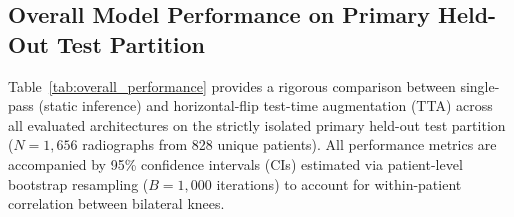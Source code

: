 \documentclass[10pt,journal]{IEEEtran}
\begin{document}
\subsection{Overall Model Performance on Primary Held-Out Test Partition}
\label{subsec:overall_performance}

Table~\ref{tab:overall_performance} provides a rigorous comparison between single-pass (static inference) and horizontal-flip test-time augmentation (TTA) across all evaluated architectures on the strictly isolated primary held-out test partition ($N = 1{,}656$ radiographs from 828 unique patients). All performance metrics are accompanied by 95\% confidence intervals (CIs) estimated via patient-level bootstrap resampling ($B = 1{,}000$ iterations) to account for within-patient correlation between bilateral knees.
\end{document}

